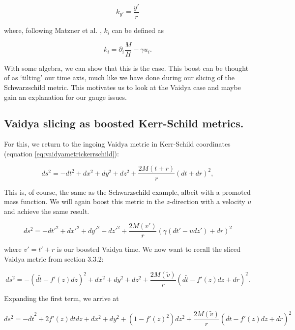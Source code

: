 \documentclass[twoside, openright]{RadboudReport}
\begin{document}
\begin{equation*}
	k_{y'} =\frac{y'}{r}
\end{equation*}


where, following Matzner et al. \cite{ksboost}, $k_i$ can be defined as

\begin{equation}
	k_i = \partial_i\frac{M}{H}-\gamma u_i.
	\label{eq:boostedkscorrections}
\end{equation}

With some algebra, we can show that this is the case. This boost can be thought of as `tilting' our time axis, much like we have done during our slicing of the Schwarzschild metric. This motivates us to look at the Vaidya case and maybe gain an explanation for our gauge issues. 

\subsection{Vaidya slicing as boosted Kerr-Schild metrics.}

For this, we return to the ingoing Vaidya metric in Kerr-Schild coordinates (equation \ref{eq:vaidyametrickerrschild}):

\begin{equation*}
	ds^2 = -dt^2 + dx^2+dy^2+dz^2+\frac{2M(t+r)}{r}(dt+dr)^2,
\end{equation*}

This is, of course, the same as the Schwarzschild example, albeit with a promoted mass function. We will again boost this metric in the $z$-direction with a velocity $u$ and achieve the same result.

\begin{equation*}
	ds^2 = -dt'^2 + dx'^2+dy'^2+dz'^2+\frac{2M(v')}{r}\left(\gamma(dt'-udz')+ dr\right)^2
\end{equation*}


where $v' = t' + r$ is our boosted Vaidya time. We now want to recall the sliced Vaidya metric from section 3.3.2:

\begin{equation}
	ds^2 = -(d\tilde{t} - f'(z)dz)^2 + dx^2 + dy^2+ dz^2 +\frac{2M(\tilde{v})}{r}(d\tilde{t} - f'(z)dz+dr)^2.
\end{equation}
\newpage

\noindent Expanding the first term, we arrive at 

\begin{equation}
	ds^2 = -d\tilde{t}^2 + 2f'(z)d\tilde{t}dz + dx^2 + dy^2+ (1-f'(z)^2)dz^2 +\frac{2M(\tilde{v})}{r}(d\tilde{t} - f'(z)dz+dr)^2
\end{equation}
\end{document}
